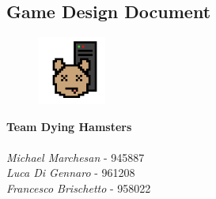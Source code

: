 \begin{titlepage}

\section*{Game Design Document}


\begin{figure}
	\centering
	\includegraphics[max width=0.2\textwidth]{../Pictures/DH_logo.png}
\end{figure}

\textbf{Team Dying Hamsters} \\ \\
\textit{Michael Marchesan} - 945887 \\
\textit{Luca Di Gennaro} - 961208 \\
\textit{Francesco Brischetto} - 958022 

\end{titlepage}

